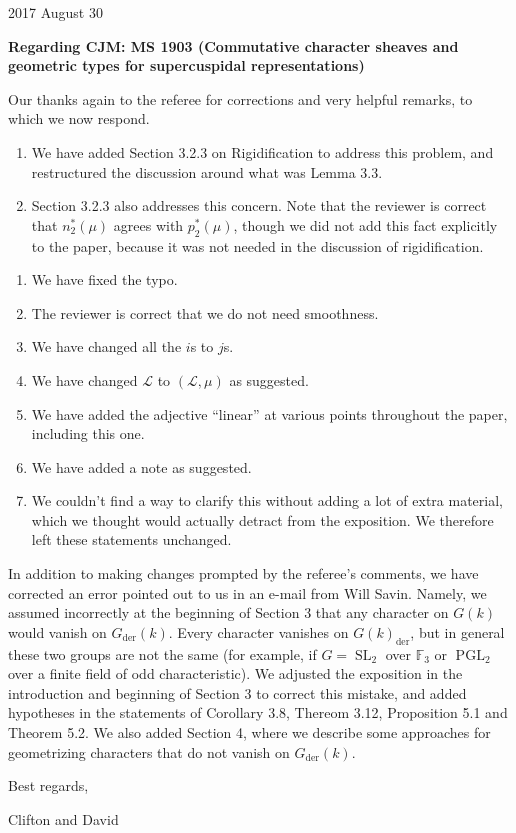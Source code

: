\documentclass[letter,10pt]{amsart}
\theoremstyle{plain}
\theoremstyle{definition}
\newcommand{\FFF}{\mathbb{F}_3}
\DeclareMathOperator{\SL}{SL}
\DeclareMathOperator{\PGL}{PGL}
\newcommand{\der}{_{\operatorname{der}}}
\newcommand{\cs}[1]{{\mathcal{#1}}}
\begin{document}
{\hfill {2017 August 30} \\ 
}



\noindent\textbf{Regarding CJM: MS 1903 (Commutative character sheaves and geometric types for supercuspidal representations)} %

\bigskip

\medskip

Our thanks again to the referee for corrections and very helpful remarks, to which we now respond.

\begin{enumerate}[label=(\arabic*)]
\item We have added Section 3.2.3 on Rigidification to address this problem, and restructured the discussion around what was Lemma 3.3.
\item Section 3.2.3 also addresses this concern.  Note that the reviewer is correct that $n^*_2(\mu)$ agrees with $p^*_2(\mu)$, though we did not add this fact explicitly to the paper, because it was not needed in the discussion of rigidification.
\end{enumerate}

\begin{enumerate}[label=(\roman*)]
\item We have fixed the typo.
\item The reviewer is correct that we do not need smoothness.
\item We have changed all the $i$s to $j$s.
\item We have changed $\cs{L}$ to $(\cs{L}, \mu)$ as suggested.
\item We have added the adjective ``linear'' at various points throughout the paper, including this one.
\item We have added a note as suggested.
\item We couldn't find a way to clarify this without adding a lot of extra material, which we thought would actually detract from the exposition.  We therefore left these statements unchanged.
\end{enumerate}

In addition to making changes prompted by the referee's comments, we have corrected an error pointed out to us in an e-mail from Will Savin.  Namely, we assumed incorrectly at the beginning of Section 3 that any character on $G(k)$ would vanish on $G\der(k)$.  Every character vanishes on $G(k)\der$, but in general these two groups are not the same (for example, if $G = \SL_2$ over $\FFF$ or $\PGL_2$ over a finite field of odd characteristic).  We adjusted the exposition in the introduction and beginning of Section 3 to correct this mistake, and added hypotheses in the statements of Corollary 3.8, Thereom 3.12, Proposition 5.1 and Theorem 5.2.  We also added Section 4, where we describe some approaches for geometrizing characters that do not vanish on $G\der(k)$.

\medskip

Best  regards,
\vskip1.5cm

Clifton and David
\end{document}
